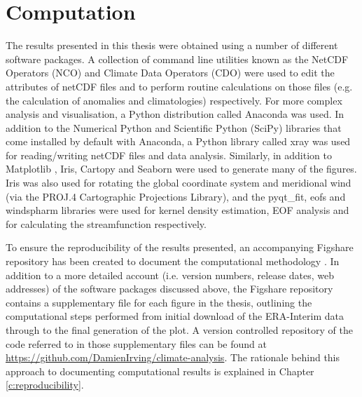 \section{Computation}\label{s:computation}


The results presented in this thesis were obtained using a number of different software packages. A collection of command line utilities known as the NetCDF Operators (NCO) and Climate Data Operators (CDO) were used to edit the attributes of netCDF files and to perform routine calculations on those files (e.g. the calculation of anomalies and climatologies) respectively. For more complex analysis and visualisation, a Python distribution called Anaconda was used. In addition to the Numerical Python \citep[NumPy;][]{VanDerWalt2011} and Scientific Python (SciPy) libraries that come installed by default with Anaconda, a Python library called xray was used for reading/writing netCDF files and data analysis. Similarly, in addition to Matplotlib \citep[the default Python plotting library;][]{Hunter2007}, Iris, Cartopy and Seaborn were used to generate many of the figures. Iris was also used for rotating the global coordinate system and meridional wind (via the PROJ.4 Cartographic Projections Library), and the pyqt\_fit, eofs and windspharm libraries were used for kernel density estimation, EOF analysis and for calculating the streamfunction respectively.

To ensure the reproducibility of the results presented, an accompanying Figshare repository has been created to document the computational methodology \citep{IrvingFigshare2016}. In addition to a more detailed account (i.e. version numbers, release dates, web addresses) of the software packages discussed above, the Figshare repository contains a supplementary file for each figure in the thesis, outlining the computational steps performed from initial download of the ERA-Interim data through to the final generation of the plot. A version controlled repository of the code referred to in those supplementary files can be found at \url{https://github.com/DamienIrving/climate-analysis}. The rationale behind this approach to documenting computational results is explained in Chapter \ref{c:reproducibility}.